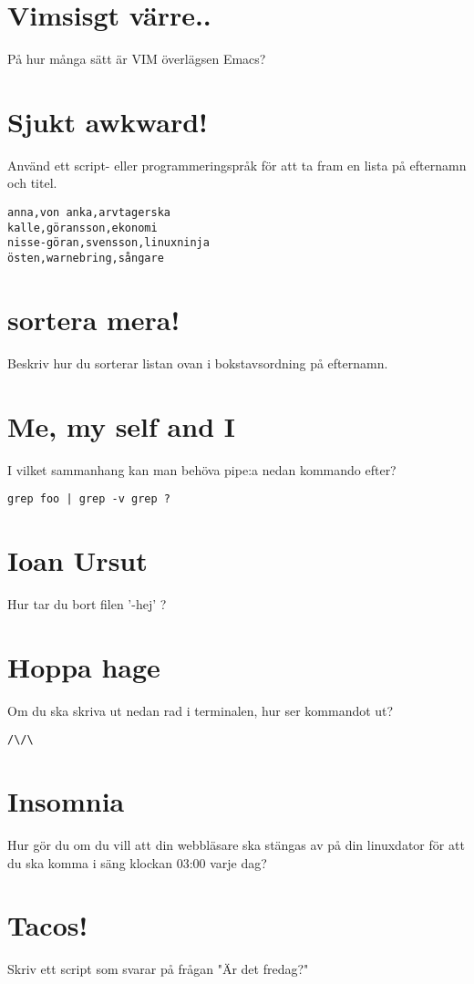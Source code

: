 \documentclass[a4paper]{report}
\begin{document}
\section{Vimsisgt värre..}
På hur många sätt är VIM överlägsen Emacs?

\section{Sjukt awkward!}
Använd ett script- eller programmeringspråk för att ta fram en lista på efternamn och titel.
\begin{verbatim}
anna,von anka,arvtagerska
kalle,göransson,ekonomi
nisse-göran,svensson,linuxninja
östen,warnebring,sångare
\end{verbatim}

\section{sortera mera!}
Beskriv hur du sorterar listan ovan i bokstavsordning på efternamn.

\section{Me, my self and I}
I vilket sammanhang kan man behöva pipe:a nedan kommando efter? 
\begin{verbatim}
grep foo | grep -v grep ?
\end{verbatim}

\section{Ioan Ursut}
Hur tar du bort filen '-hej' ?

\section{Hoppa hage}
Om du ska skriva ut nedan rad i terminalen, hur ser kommandot ut? 
\begin{verbatim}
/\/\
\end{verbatim}

\section{Insomnia}
Hur gör du om du vill att din webbläsare ska stängas av på din linuxdator för att du ska komma i säng klockan 03:00 varje dag?

\section{Tacos!}
Skriv ett script som svarar på frågan "Är det fredag?"
\end{document}
